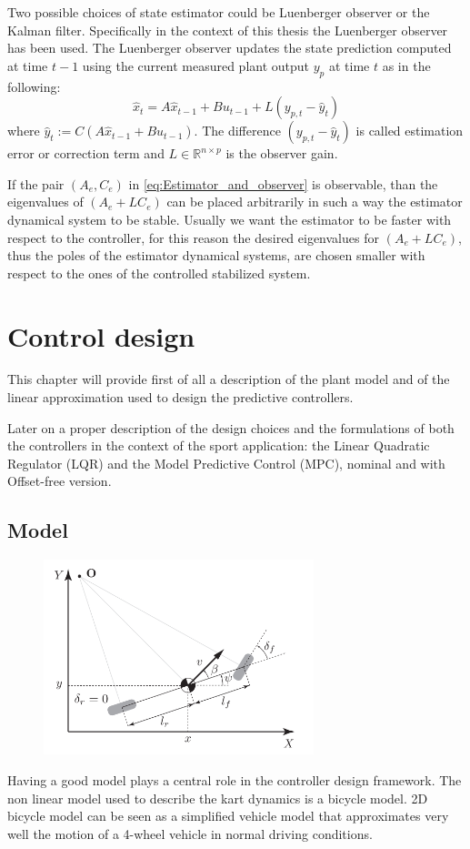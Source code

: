 \documentclass[a4paper,12pt,oneside]{book}
\begin{document}
\bigskip
Two possible choices of state estimator could be Luenberger observer or the Kalman filter. 
Specifically in the context of this thesis the Luenberger observer has been used.
The Luenberger observer updates the state prediction computed at time $t-1$ using the current measured plant output $y_p$ at time $t$ as in the following:
\begin{equation}
    \hat{x}_t = A \hat{x}_{t-1} + B u_{t-1} + L (y_{p,t} - \hat{y}_t)
\end{equation}
where $\hat{y}_t := C(A \hat{x}_{t-1} + B u_{t-1})$.
The difference $(y_{p,t} - \hat{y}_t)$ is called estimation error or correction term and $L \in \mathbb{R}^{n \times p}$ is the observer gain.

\bigskip
If the pair $(A_e,C_e)$ in \ref{eq:Estimator_and_observer} is observable, than the eigenvalues of $(A_e+LC_e)$ can be placed arbitrarily in such a way the estimator dynamical system to be stable.
Usually we want the estimator to be faster with respect to the controller, for this reason the desired eigenvalues for $(A_e+LC_e)$, thus the poles of the estimator dynamical systems, are chosen smaller with respect to the ones of the controlled stabilized system.

\chapter{Control design}
\label{chapter:Control_design}
This chapter will provide first of all a description of the plant model and of the linear approximation used to design the predictive controllers. 

Later on a proper description of the design choices and the formulations of both the controllers in the context of the sport application: the Linear Quadratic Regulator (LQR) and the Model Predictive Control (MPC), nominal and with Offset-free version.

\section{Model}
\begin{figure}[h!]
	\centering
	\includegraphics[width=0.7\textwidth]{Bycicle_scheme.png}
\end{figure}
Having a good model plays a central role in the controller design framework.
The non linear model used to describe the kart dynamics is a bicycle model.
2D bicycle model can be seen as a simplified vehicle model that approximates very well the motion of a 4-wheel vehicle in normal driving conditions.
\end{document}
